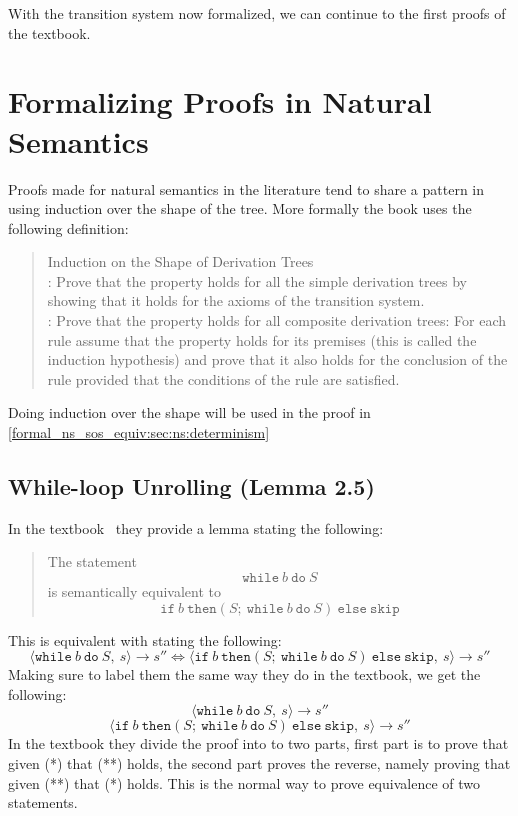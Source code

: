 With the transition system now formalized, we can continue to the first proofs of the textbook.

%
%
%
\section{Formalizing Proofs in Natural Semantics}
\label{formal_ns_sos_equiv:sec:ns:proofs}
Proofs made for natural semantics in the literature tend to share a pattern in using induction over the shape of the tree.
More formally the book uses the following definition:
\begin{quotation}
\noindent
Induction on the Shape of Derivation Trees\vspace{1em} \\  : Prove that the property holds for all the simple derivation trees by
showing that it holds for the axioms of the transition system.\vspace{1em} \\ : Prove that the property holds for all composite derivation trees: For
each rule assume that the property holds for its premises (this is
called the induction hypothesis) and prove that it also holds for the
conclusion of the rule provided that the conditions of the rule are
satisfied.
\end{quotation}
Doing induction over the shape will be used in the proof in \autoref{formal_ns_sos_equiv:sec:ns:determinism}

%
%
\subsection{While-loop Unrolling (Lemma 2.5)}
\label{formal_ns_sos_equiv:sec:ns:while_unroll}
In the textbook~\citep[p.~26]{nielson_semantics_2007} they provide a lemma stating the following:
\begin{quote}
The statement
\[\mathtt{while}\ b\ \mathtt{do}\ S\]
is semantically equivalent to
\[\mathtt{if}\ b\ \mathtt{then} (S;\ \mathtt{while}\ b\ \mathtt{do}\ S)\ \mathtt{else}\ \mathtt{skip}\]
\end{quote}
This is equivalent with stating the following:
\[
    \langle \mathtt{while}\ b\ \mathtt{do}\ S,\ s\rangle \to s'' \iff  \langle \mathtt{if}\ b\ \mathtt{then} (S;\ \mathtt{while}\ b\ \mathtt{do}\ S)\ \mathtt{else}\ \mathtt{skip},\ s\rangle \to s''
\]
Making sure to label them the same way they do in the textbook, we get the following:
\[
\langle \mathtt{while}\ b\ \mathtt{do}\ S,\ s\rangle \to s'' \tag{*}
\]
\[
\langle \mathtt{if}\ b\ \mathtt{then} (S;\ \mathtt{while}\ b\ \mathtt{do}\ S)\ \mathtt{else}\ \mathtt{skip},\ s\rangle \to s'' \tag{**}
\]
In the textbook they divide the proof into to two parts, first part is to prove that given (*) that (**) holds,
the second part proves the reverse, namely proving that given (**) that (*) holds.
This is the normal way to prove equivalence of two statements.

